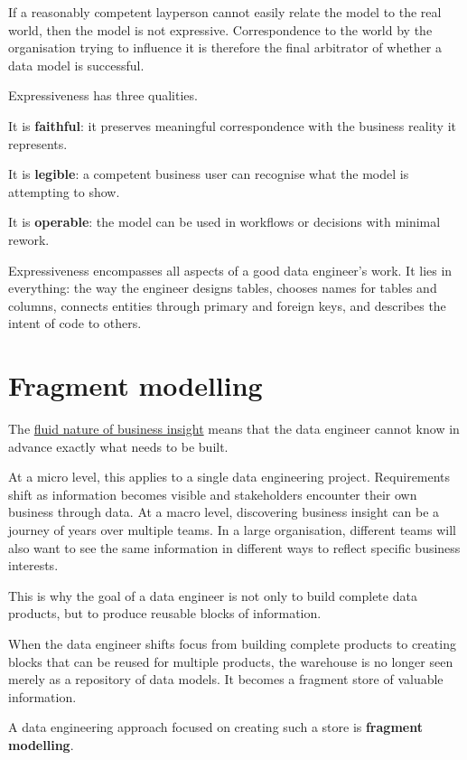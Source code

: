 \documentclass[10pt,openany,10pt]{book}
\begin{document}
If a reasonably competent layperson cannot easily relate the model to
the real world, then the model is not expressive. Correspondence to the
world by the organisation trying to influence it is therefore the final
arbitrator of whether a data model is successful.

Expressiveness has three qualities.

It is \textbf{faithful}: it preserves meaningful correspondence with the
business reality it represents.

It is \textbf{legible}: a competent business user can recognise what the
model is attempting to show.

It is \textbf{operable}: the model can be used in workflows or decisions
with minimal rework.

Expressiveness encompasses all aspects of a good data engineer's work.
It lies in everything: the way the engineer designs tables, chooses
names for tables and columns, connects entities through primary and
foreign keys, and describes the intent of code to others.

\section{Fragment modelling}\label{fragment-modelling}

The \hyperref[docs-foundations-what-is-data-engineering]{fluid nature of
business insight} means that the data engineer cannot know in advance
exactly what needs to be built.

At a micro level, this applies to a single data engineering project.
Requirements shift as information becomes visible and stakeholders
encounter their own business through data. At a macro level, discovering
business insight can be a journey of years over multiple teams. In a
large organisation, different teams will also want to see the same
information in different ways to reflect specific business interests.

This is why the goal of a data engineer is not only to build complete
data products, but to produce reusable blocks of information.

When the data engineer shifts focus from building complete products to
creating blocks that can be reused for multiple products, the warehouse
is no longer seen merely as a repository of data models. It becomes a
fragment store of valuable information.

A data engineering approach focused on creating such a store is
\textbf{fragment modelling}.
\end{document}
